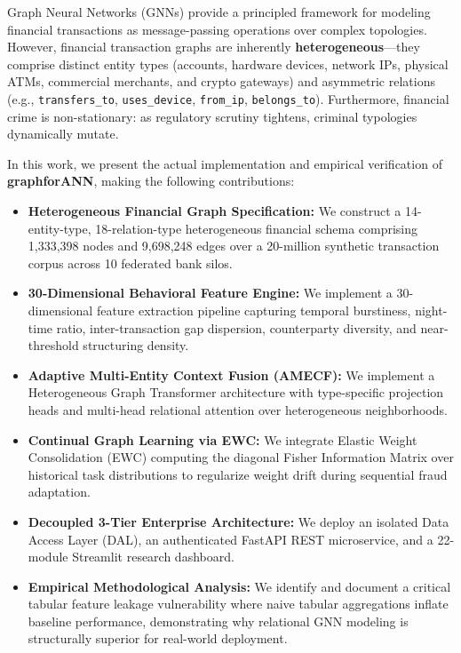 \documentclass[conference]{IEEEtran}
\begin{document}
Graph Neural Networks (GNNs) provide a principled framework for modeling financial transactions as message-passing operations over complex topologies. However, financial transaction graphs are inherently \textbf{heterogeneous}---they comprise distinct entity types (accounts, hardware devices, network IPs, physical ATMs, commercial merchants, and crypto gateways) and asymmetric relations (e.g., \texttt{transfers\_to}, \texttt{uses\_device}, \texttt{from\_ip}, \texttt{belongs\_to}). Furthermore, financial crime is non-stationary: as regulatory scrutiny tightens, criminal typologies dynamically mutate.

In this work, we present the actual implementation and empirical verification of \textbf{graphforANN}, making the following contributions:
\begin{itemize}
    \item \textbf{Heterogeneous Financial Graph Specification:} We construct a 14-entity-type, 18-relation-type heterogeneous financial schema comprising 1,333,398 nodes and 9,698,248 edges over a 20-million synthetic transaction corpus across 10 federated bank silos.
    \item \textbf{30-Dimensional Behavioral Feature Engine:} We implement a 30-dimensional feature extraction pipeline capturing temporal burstiness, night-time ratio, inter-transaction gap dispersion, counterparty diversity, and near-threshold structuring density.
    \item \textbf{Adaptive Multi-Entity Context Fusion (AMECF):} We implement a Heterogeneous Graph Transformer architecture with type-specific projection heads and multi-head relational attention over heterogeneous neighborhoods.
    \item \textbf{Continual Graph Learning via EWC:} We integrate Elastic Weight Consolidation (EWC) computing the diagonal Fisher Information Matrix over historical task distributions to regularize weight drift during sequential fraud adaptation.
    \item \textbf{Decoupled 3-Tier Enterprise Architecture:} We deploy an isolated Data Access Layer (DAL), an authenticated FastAPI REST microservice, and a 22-module Streamlit research dashboard.
    \item \textbf{Empirical Methodological Analysis:} We identify and document a critical tabular feature leakage vulnerability where naive tabular aggregations inflate baseline performance, demonstrating why relational GNN modeling is structurally superior for real-world deployment.
\end{itemize}
\end{document}
